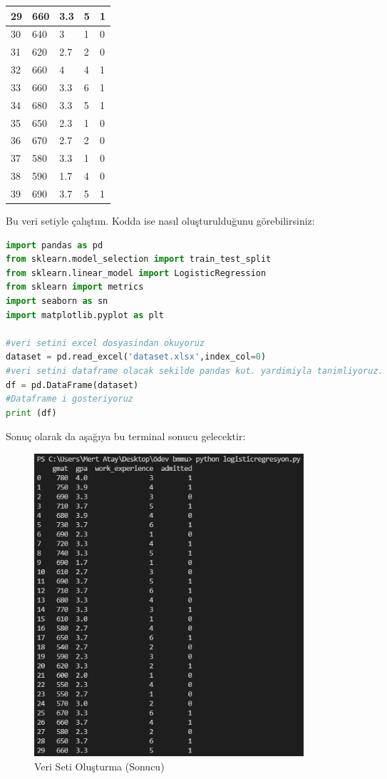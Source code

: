 \documentclass{article}
\begin{document}
\begin{table}
\begin{tabular}{|l|l|l|l|l|}
        29 & 660 & 3.3 & 5 & 1 \\ \hline
        30 & 640 & 3 & 1 & 0 \\ \hline
        31 & 620 & 2.7 & 2 & 0 \\ \hline
        32 & 660 & 4 & 4 & 1 \\ \hline
        33 & 660 & 3.3 & 6 & 1 \\ \hline
        34 & 680 & 3.3 & 5 & 1 \\ \hline
        35 & 650 & 2.3 & 1 & 0 \\ \hline
        36 & 670 & 2.7 & 2 & 0 \\ \hline
        37 & 580 & 3.3 & 1 & 0 \\ \hline
        38 & 590 & 1.7 & 4 & 0 \\ \hline
        39 & 690 & 3.7 & 5 & 1 \\ \hline
    \end{tabular}
\end{table}

\newpage

Bu veri setiyle çalıştım. Kodda ise nasıl oluşturulduğunu görebilirsiniz:

\begin{lstlisting}[language=Python, caption=Veri Seti Oluşturma]
import pandas as pd
from sklearn.model_selection import train_test_split
from sklearn.linear_model import LogisticRegression
from sklearn import metrics
import seaborn as sn
import matplotlib.pyplot as plt

#veri setini excel dosyasindan okuyoruz
dataset = pd.read_excel('dataset.xlsx',index_col=0)
#veri setini dataframe olacak sekilde pandas kut. yardimiyla tanimliyoruz.
df = pd.DataFrame(dataset)
#Dataframe i gosteriyoruz
print (df)
\end{lstlisting}


Sonuç olarak da aşağıya bu terminal sonucu gelecektir:
\begin{figure}[htp]
    \centering
    \includegraphics[width=10cm]{1.png}
    \caption{Veri Seti Oluşturma (Sonucu)}
    \label{fig:galaxy}
\end{figure}
\end{document}
